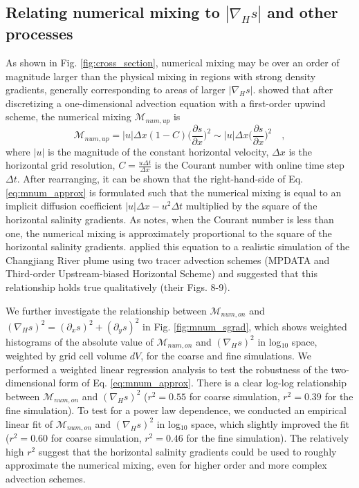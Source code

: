 \subsection{Relating numerical mixing to $|\nabla_H s|$ and other processes} \label{sec:salinity_gradient_mag}

As shown in Fig. \ref{fig:cross_section}, numerical mixing may be over an order of magnitude larger than the physical mixing in regions with strong density gradients, generally corresponding to areas of larger $|\nabla_H s|$. \citet{Smolarkiewicz_1983} showed that after discretizing a one-dimensional advection equation with a first-order upwind scheme, the numerical mixing $\mathcal{M}_{num, up}$ is
\begin{equation} \label{eq:mnum_approx}
    \mathcal{M}_{num, up} = |u|\Delta x (1-C) \bigg(\frac{\partial s}{\partial x} \bigg)^2 \sim |u|\Delta x \bigg(\frac{\partial s}{\partial x} \bigg)^2 \quad ,
\end{equation}
where $|u|$ is the magnitude of the constant horizontal velocity, $\Delta x$ is the horizontal grid resolution, $C=\frac{u \Delta t}{\Delta x}$ is the Courant number with online time step $\Delta t$. After rearranging, it can be shown that the right-hand-side of Eq. \ref{eq:mnum_approx} is formulated such that the numerical mixing is equal to an implicit diffusion coefficient $|u|\Delta x-u^2 \Delta t$ multiplied by the square of the horizontal salinity gradients. As \citet{Wang_2021} notes, when the Courant number is less than one, the numerical mixing is approximately proportional to the square of the horizontal salinity gradients. \citet{Wang_2021} applied this equation to a realistic simulation of the Changjiang River plume using two tracer advection schemes (MPDATA and Third-order Upstream-biased Horizontal Scheme) and suggested that this relationship holds true qualitatively (their Figs. 8-9). 

We further investigate the relationship between $\mathcal{M}_{num, on}$ and $(\nabla_H s)^2 = (\partial_x s)^2+(\partial_y s)^2$ in Fig. \ref{fig:mnum_sgrad}, which shows weighted histograms of the absolute value of $\mathcal{M}_{num, on}$ and $(\nabla_H s)^2$ in log$_{10}$ space, weighted by grid cell volume $dV$, for the coarse and fine simulations. We performed a weighted linear regression analysis to test the robustness of the two-dimensional form of Eq. \ref{eq:mnum_approx}. There is a clear log-log relationship between $\mathcal{M}_{num, on}$ and $(\nabla_H s)^2$ ($r^2=0.55$ for coarse simulation, $r^2=0.39$ for the fine simulation). To test for a power law dependence, we conducted an empirical linear fit of $\mathcal{M}_{num, on}$ and $(\nabla_H s)^2$ in log$_{10}$ space, which slightly improved the fit ($r^2=0.60$ for coarse simulation, $r^2=0.46$ for the fine simulation). The relatively high $r^2$ suggest that the horizontal salinity gradients could be used to roughly approximate the numerical mixing, even for higher order and more complex advection schemes.


